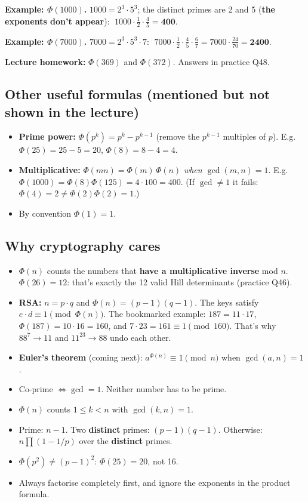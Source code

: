 \textbf{Example: $\Phi(1000)$.} $1000 = 2^3 \cdot 5^3$; the distinct primes are 2 and 5 (\textbf{the exponents don't appear}):
$\;1000 \cdot \frac12 \cdot \frac45 = \mathbf{400}$.

\textbf{Example: $\Phi(7000)$.} $7000 = 2^3 \cdot 5^3 \cdot 7$:
$\;7000 \cdot \frac12 \cdot \frac45 \cdot \frac67 = 7000 \cdot \frac{24}{70} = \mathbf{2400}$.

\textbf{Lecture homework:} $\Phi(369)$ and $\Phi(372)$. Answers in practice Q48.

\subsection{Other useful formulas (mentioned but not shown in the lecture)}
\begin{itemize}
  \item \textbf{Prime power:} $\Phi(p^k) = p^k - p^{k-1}$ (remove the $p^{k-1}$ multiples of $p$). E.g.\ $\Phi(25) = 25 - 5 = 20$, $\Phi(8) = 8 - 4 = 4$.
  \item \textbf{Multiplicative:} $\Phi(mn) = \Phi(m)\,\Phi(n)$ \emph{when $\gcd(m, n) = 1$}. E.g.\ $\Phi(1000) = \Phi(8)\Phi(125) = 4 \cdot 100 = 400$. (If $\gcd \ne 1$ it fails: $\Phi(4) = 2 \ne \Phi(2)\Phi(2) = 1$.)
  \item By convention $\Phi(1) = 1$.
\end{itemize}

\subsection{Why cryptography cares}
\begin{itemize}
  \item $\Phi(n)$ counts the numbers that \textbf{have a multiplicative inverse} mod $n$. $\Phi(26) = 12$: that's exactly the 12 valid Hill determinants (practice Q46).
  \item \textbf{RSA:} $n = p \cdot q$ and $\Phi(n) = (p-1)(q-1)$. The keys satisfy $e \cdot d \equiv 1 \pmod{\Phi(n)}$.
  The bookmarked example: $187 = 11 \cdot 17$, $\Phi(187) = 10 \cdot 16 = 160$, and $7 \cdot 23 = 161 \equiv 1 \pmod{160}$. That's why $88^7 \to 11$ and $11^{23} \to 88$ undo each other.
  \item \textbf{Euler's theorem} (coming next): $a^{\Phi(n)} \equiv 1 \pmod n$ when $\gcd(a, n) = 1$.
\end{itemize}

\begin{examtip}
\begin{itemize}
  \item Co-prime $\iff \gcd = 1$. Neither number has to be prime.
  \item $\Phi(n)$ counts $1 \le k < n$ with $\gcd(k, n) = 1$.
  \item Prime: $n - 1$. Two \textbf{distinct} primes: $(p-1)(q-1)$. Otherwise: $n\prod(1 - 1/p)$ over the \textbf{distinct} primes.
  \item $\Phi(p^2) \ne (p-1)^2$: $\Phi(25) = 20$, not 16.
  \item Always factorise completely first, and ignore the exponents in the product formula.
\end{itemize}
\end{examtip}

